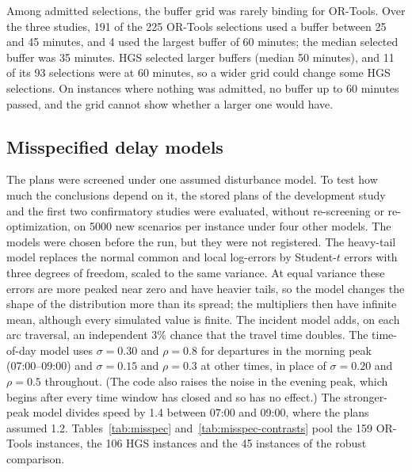 Among admitted selections, the buffer grid was rarely binding for OR-Tools. Over the three studies, 191 of the 225 OR-Tools selections used a buffer between 25 and 45 minutes, and 4 used the largest buffer of 60 minutes; the median selected buffer was 35 minutes. HGS selected larger buffers (median 50 minutes), and 11 of its 93 selections were at 60 minutes, so a wider grid could change some HGS selections. On instances where nothing was admitted, no buffer up to 60 minutes passed, and the grid cannot show whether a larger one would have.

\subsection{Misspecified delay models}\label{sec:misspec}

The plans were screened under one assumed disturbance model. To test how much the conclusions depend on it, the stored plans of the development study and the first two confirmatory studies were evaluated, without re-screening or re-optimization, on 5000 new scenarios per instance under four other models. The models were chosen before the run, but they were not registered. The heavy-tail model replaces the normal common and local log-errors by Student-$t$ errors with three degrees of freedom, scaled to the same variance. At equal variance these errors are more peaked near zero and have heavier tails, so the model changes the shape of the distribution more than its spread; the multipliers then have infinite mean, although every simulated value is finite. The incident model adds, on each arc traversal, an independent 3\% chance that the travel time doubles. The time-of-day model uses $\sigma=0.30$ and $\rho=0.8$ for departures in the morning peak (07:00--09:00) and $\sigma=0.15$ and $\rho=0.3$ at other times, in place of $\sigma=0.20$ and $\rho=0.5$ throughout. (The code also raises the noise in the evening peak, which begins after every time window has closed and so has no effect.) The stronger-peak model divides speed by 1.4 between 07:00 and 09:00, where the plans assumed 1.2. Tables~\ref{tab:misspec} and~\ref{tab:misspec-contrasts} pool the 159 OR-Tools instances, the 106 HGS instances and the 45 instances of the robust comparison.

